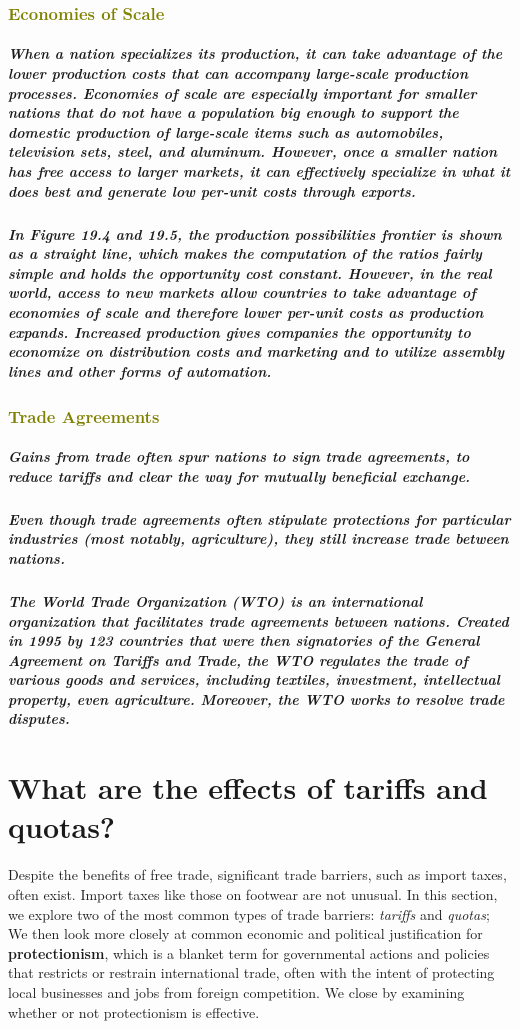 \documentclass[11pt]{article} %
\begin{document}
\subsubsection*{\textcolor{olive}{Economies of Scale}}
\subparagraph*{
When a nation specializes its production, it can take advantage of the lower production costs that can accompany large-scale production processes. Economies of scale are especially important for smaller nations that do not have a population big enough to support the domestic production of large-scale items such as automobiles, television sets, steel, and aluminum. However, once a smaller nation has free access to larger markets, it can effectively specialize in what it does best and generate low per-unit costs through exports.}
\subparagraph*{
In Figure 19.4 and 19.5, the production possibilities frontier is shown as a straight line, which makes the computation of the ratios fairly simple and holds the opportunity cost constant. However, in the real world, access to new markets allow countries to take advantage of economies of scale and therefore lower per-unit costs as production expands. Increased production gives companies the opportunity to economize on distribution costs and marketing and to utilize assembly lines and other forms of automation.}
\subsubsection*{\textcolor{olive}{Trade Agreements}}
\subparagraph*{Gains from trade often spur nations to sign trade agreements, to reduce tariffs and clear the way for mutually beneficial exchange.}
\subparagraph*{Even though trade agreements often stipulate protections for particular industries (most notably, agriculture), they still increase trade between nations.}
\subparagraph*{The World Trade Organization (WTO) is an international organization that facilitates trade agreements between nations. Created in 1995 by 123 countries that were then signatories of the General Agreement on Tariffs and Trade, the WTO regulates the trade of various goods and services, including textiles, investment, intellectual property, even agriculture. Moreover, the WTO works to resolve trade disputes.}

\section*{\textbf{What are the effects of tariffs and quotas?}}
Despite the benefits of free trade, significant trade barriers, such as import taxes, often exist.
Import taxes like those on footwear are not unusual. In this section, we explore two of the most common types of trade barriers: \textit{tariffs} and \textit{quotas}; We then look more closely at common economic and political justification for \textbf{protectionism}, which is a blanket term for governmental actions and policies that restricts or restrain international trade, often with the intent of protecting local businesses and jobs from foreign competition. We close by examining whether or not protectionism is effective.
\end{document}
